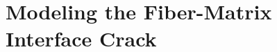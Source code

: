 \documentclass[first,firstsupp,lastsupp,last,hyperref,table]{ETHclass}
\begin{document}
\section[Debond Modeling]{Modeling the Fiber-Matrix Interface Crack}
%
%
%
%
%
%
\end{document}
